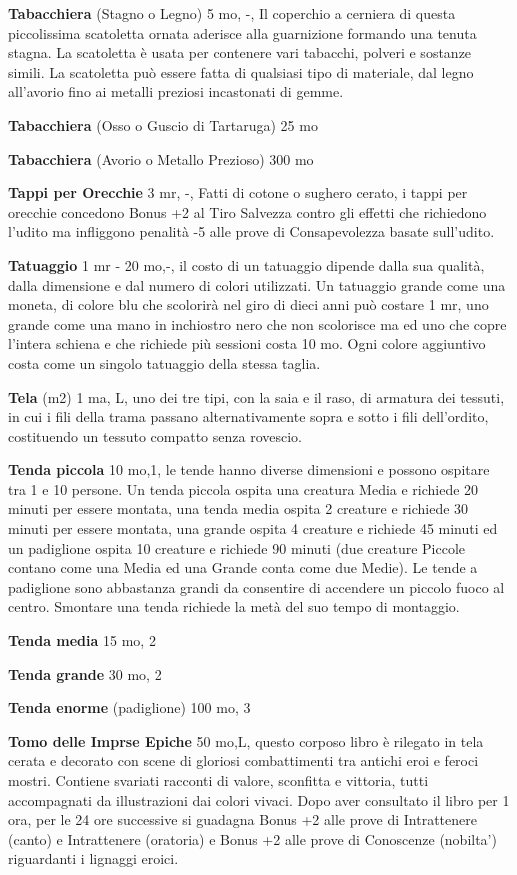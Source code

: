 \documentclass[a4paper,11pt,twoside,openany]{book}
\begin{document}
{\textbf{Tabacchiera} (Stagno o Legno) 5 mo, -, Il coperchio a cerniera di questa piccolissima scatoletta ornata aderisce alla guarnizione formando una tenuta stagna. La scatoletta è usata per contenere vari tabacchi, polveri e sostanze simili. La scatoletta può essere fatta di qualsiasi tipo di materiale, dal legno all'avorio fino ai metalli preziosi incastonati di gemme.

\textbf{Tabacchiera} (Osso o Guscio di Tartaruga) 25 mo

\textbf{Tabacchiera} (Avorio o Metallo Prezioso) 300 mo

\textbf{Tappi per Orecchie} 3 mr, -, Fatti di cotone o sughero cerato, i tappi per orecchie concedono Bonus +2 al Tiro Salvezza contro gli effetti che richiedono l'udito ma infliggono penalità -5 alle prove di Consapevolezza basate sull'udito.

\textbf{Tatuaggio} 1 mr - 20 mo,-, il costo di un tatuaggio dipende dalla sua qualità, dalla dimensione e dal numero di colori utilizzati. Un tatuaggio grande come una moneta, di colore blu che scolorirà nel giro di dieci anni può costare 1 mr, uno grande come una mano in inchiostro nero che non scolorisce ma ed uno che copre l'intera schiena e che richiede più sessioni costa 10 mo. 
Ogni colore aggiuntivo costa come un singolo tatuaggio della stessa taglia.

\textbf{Tela} (m2) 1 ma, L, uno dei tre tipi, con la saia e il raso, di armatura dei tessuti, in cui i fili della trama passano alternativamente sopra e sotto i fili dell'ordito, costituendo un tessuto compatto senza rovescio.

\textbf{Tenda piccola} 10 mo,1, le tende hanno diverse dimensioni e possono ospitare tra 1 e 10 persone. Un tenda piccola ospita una creatura Media e richiede 20 minuti per essere montata, una tenda media ospita 2 creature e richiede 30 minuti per essere montata, una grande ospita 4 creature e richiede 45 minuti ed un padiglione ospita 10 creature e richiede 90 minuti (due creature Piccole contano come una Media ed una Grande conta come due Medie). Le tende a padiglione sono abbastanza grandi da consentire di accendere un piccolo fuoco al centro. Smontare una tenda richiede la metà del suo tempo di montaggio.

\textbf{Tenda media} 15 mo, 2

\textbf{Tenda grande} 30 mo, 2

\textbf{Tenda enorme} (padiglione) 100 mo, 3

\textbf{Tomo delle Imprse Epiche} 50 mo,L, questo corposo libro è rilegato in tela cerata e decorato con scene di gloriosi combattimenti tra antichi eroi e feroci mostri.
Contiene svariati racconti di valore, sconfitta e vittoria, tutti accompagnati da illustrazioni dai colori vivaci.
Dopo aver consultato il libro per 1 ora, per le 24 ore successive si guadagna Bonus +2 alle prove di Intrattenere (canto) e Intrattenere (oratoria) e Bonus +2 alle prove di Conoscenze (nobilta') riguardanti i lignaggi eroici.

}
\end{document}

